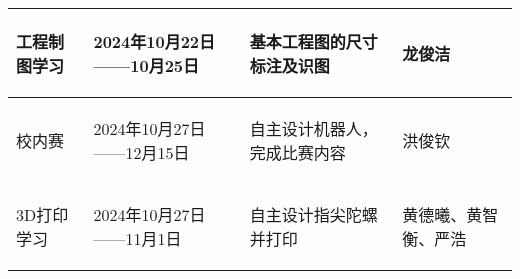 \begin{longtable}{ p{1.5cm} | p{3cm} | p{6cm} | p{4.3cm} |}
    \hline

        \begin{center}
            工程制图学习
        \end{center}&
        \begin{center}
            2024年10月22日——10月25日
        \end{center}&
        \begin{center}
            基本工程图的尺寸标注及识图
        \end{center}&
        \begin{center}
            龙俊洁
        \end{center}\\
        
    \hline
    
        \begin{center}
            校内赛
        \end{center} &
        \begin{center}
            2024年10月27日——12月15日
        \end{center} &
        \begin{center}
            自主设计机器人，完成比赛内容
        \end{center} &
        \begin{center}
            洪俊钦
        \end{center} \\

    \hline
    
        \begin{center}
            3D打印学习
        \end{center} &
        \begin{center}
            2024年10月27日——11月1日
        \end{center} &
        \begin{center}
            自主设计指尖陀螺并打印
        \end{center} &
        \begin{center}
            黄德曦、黄智衡、严浩
        \end{center} \\

    \hline


\end{longtable}
